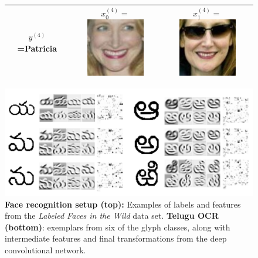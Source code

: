 \documentclass[twoside,11pt]{article}
\begin{document}
\begin{figure}[t]
\begin{tabular}{|c|c|c|}
$y^{(4)}$=Patricia &
  $x_0^{(4)} = $\includegraphics[scale = 0.2]{face_photos/Patricia_Clarkson_0001.png} &
  $x_1^{(4)} = $\includegraphics[scale = 0.2]{face_photos/Patricia_Clarkson_0004.png} \\ \hline
\end{tabular}
\includegraphics[scale=0.3]{telugu_glyphs.png}
\caption{\textbf{Face recognition setup (top):} Examples of labels and features from the \emph{Labeled Faces in the Wild} data set. \textbf{Telugu OCR (bottom)}: exemplars from six of the glyph classes, along with intermediate features and final transformations from the deep convolutional network.}
\label{fig:face_rec}
\end{figure}
\end{document}
